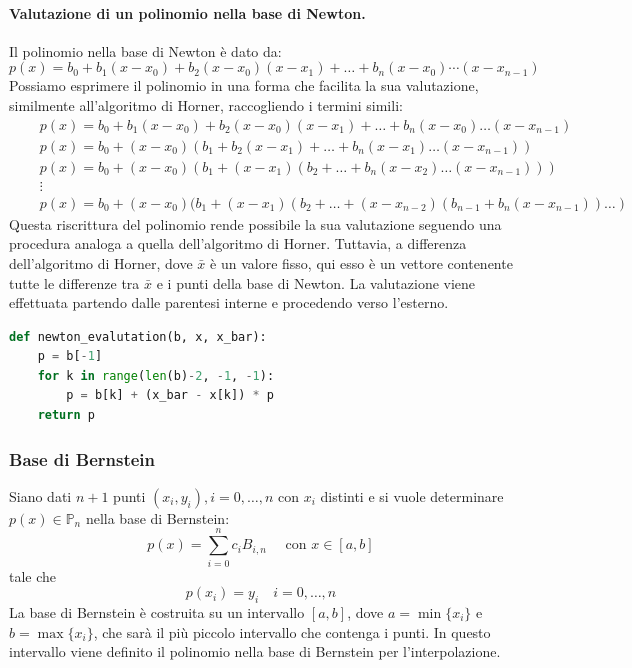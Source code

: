 \documentclass{article}
\begin{document}
\paragraph{Valutazione di un polinomio nella base di Newton.}
Il polinomio nella base di Newton è dato da:
$$p(x)=b_0+b_1(x-x_0)+b_2(x-x_0)(x-x_1)+\ldots+b_n(x-x_0)\cdots(x-x_{n-1})$$
Possiamo esprimere il polinomio in una forma che facilita la sua valutazione,
similmente all'algoritmo di Horner, raccogliendo i termini simili:
\begin{align*}
& \quad p(x) = b_0 + b_1(x-x_0) + b_2(x-x_0)(x-x_1) + \ldots + b_n(x-x_0) \ldots (x-x_{n-1}) \\
& \quad p(x) = b_0 + (x-x_0)(b_1 + b_2(x-x_1) + \ldots + b_n(x-x_1) \ldots (x-x_{n-1})) \\
& \quad p(x) = b_0 + (x-x_0)(b_1 + (x-x_1)(b_2 + \ldots + b_n(x-x_2) \ldots (x-x_{n-1}))) \\
& \quad \vdots \\
& \quad p(x) = b_0 + (x-x_0)(b_1 + (x-x_1)(b_2 + \ldots + (x-x_{n-2})(b_{n-1} + b_n(x-x_{n-1}))\ldots)
\end{align*}
Questa riscrittura del polinomio rende possibile la sua valutazione seguendo
una procedura analoga a quella dell'algoritmo di Horner. Tuttavia, a
differenza dell'algoritmo di Horner, dove $\bar{x}$ è un valore fisso, qui
esso è un vettore contenente tutte le differenze tra $\bar{x}$ e i punti della
base di Newton. La valutazione viene effettuata partendo dalle parentesi
interne e procedendo verso l'esterno.
\begin{lstlisting}[language=Python]
def newton_evalutation(b, x, x_bar):
    p = b[-1]
    for k in range(len(b)-2, -1, -1):
        p = b[k] + (x_bar - x[k]) * p
    return p
\end{lstlisting}
\subsubsection{Base di Bernstein}
Siano dati $n+1$ punti $(x_i,y_i),i=0,\ldots,n$ con $x_i$ distinti e si vuole
determinare $p(x)\in \mathbb{P}_n$ nella base di Bernstein:
$$p(x)=\displaystyle\sum_{i=0}^{n}c_iB_{i,n}\quad \text{ con }x\in[a,b]$$
tale che 
$$p(x_i)=y_i\quad i=0,\ldots, n$$
La base di Bernstein è costruita su un intervallo $[a,b]$, dove
$a=\min\{x_i\}$ e $b=\max\{x_i\}$, che sarà il più piccolo intervallo che
contenga i punti. In questo intervallo viene definito il polinomio 
nella base di Bernstein per l'interpolazione. 
\end{document}
